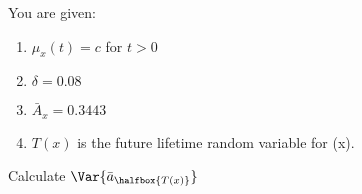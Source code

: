 You are given:
\begin{enumerate}
  \item $\mu_x(t) = c$ for $t>0$
  \item $\delta = 0.08$
  \item $\bar{A}_x = 0.3443$
  \item $T(x)$ is the future lifetime random variable for (x).
\end{enumerate}
Calculate $\Var{\bar{a}_{\halfbox{T(x)}}}$

\showsol{\bsoln

\esoln}

